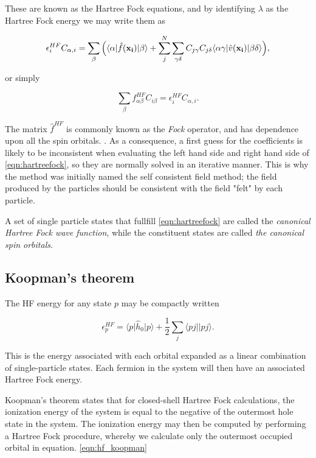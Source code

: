 These are known as the Hartree Fock equations, and by identifying $\lambda$ as the Hartree Fock energy \cite{hh4480} we may write them as

\begin{equation}
\epsilon_i^{HF} C_{\alpha,i} =  
\sum_{\beta} \Big{(}  {\langle \alpha |\hat{f}(\mathbf{x_i}) | \beta \rangle + \sum_j^N \sum_{\gamma \delta}{C_{j \gamma} C_{j \delta}  \langle \alpha \gamma |\hat{v}(\mathbf{x_i}) | \beta \delta \rangle } } \Big{)},
 \label{eqn:HF2}
\end{equation}

or simply 

\begin{equation}
\sum_\beta f_{\alpha \beta}^{HF} C_{i \beta} = \epsilon_i^{HF} C_{\alpha,i} .
\label{eqn:hartreefock}
\end{equation}

The matrix $ \hat{f}^{HF} $ is commonly known as the \emph{Fock} operator, and has dependence upon all the spin orbitals. \cite{ShavittBartlett2009}. As a consequence, a first guess for the coefficients is likely to be inconsistent when evaluating the left hand side and right hand side of \ref{eqn:hartreefock}, so they are normally solved in an iterative manner. This is why the method was initially named the self consistent field method; the field produced by the particles should be consistent with the field "felt" by each particle.

A set of single particle states that fullfill \ref{eqn:hartreefock} are called the \emph{canonical Hartree Fock wave function}, while the constituent states are called \emph{the canonical spin orbitals}. 

\subsection{Koopman's theorem}

The HF energy for any state $p$ may be compactly written

\begin{equation}
\epsilon^{HF}_p = \langle p \vert \hat{h}_0 \vert p \rangle + \frac{1}{2} \sum_{j} \langle pj \vert  \vert pj \rangle .
\label{eqn:hf_koopman}
\end{equation}

This is the energy associated with each orbital expanded as a linear combination of single-particle states. Each fermion in the system will then have an associated Hartree Fock energy.

Koopman's theorem states that for closed-shell Hartree Fock calculations, the ionization energy of the system is equal to the negative of the outermost hole state in the system. \cite{Thijssen} The ionization energy may then be computed by performing a Hartree Fock procedure, whereby we calculate only the outermost occupied orbital in equation. \ref{eqn:hf_koopman}

